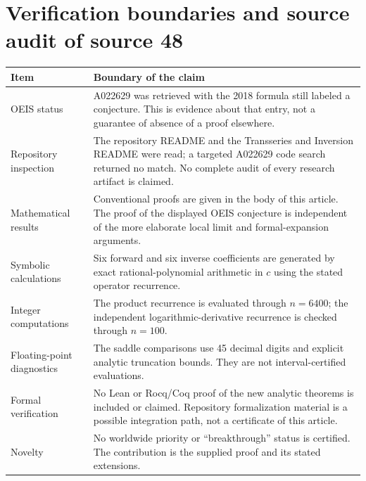 \documentclass[11pt]{article}
\numberwithin{equation}{section}
\theoremstyle{definition}\newtheorem{definition}[theorem]{Definition}
\theoremstyle{remark}\newtheorem{remark}[theorem]{Remark}
\begin{document}
\section{Verification boundaries and source audit of source 48}\label{dpn:48:app:audit}
\begin{center}
\small
\begin{tabular}{>{\raggedright\arraybackslash}p{}>{\raggedright\arraybackslash}p{}}
\toprule
Item & Boundary of the claim\\
\midrule
OEIS status & A022629 was retrieved with the 2018 formula still labeled a
conjecture.  This is evidence about that entry, not a guarantee of absence of
a proof elsewhere.\\[3pt]
Repository inspection & The repository README and the Transseries and
Inversion README were read; a targeted A022629 code search returned no match.
No complete audit of every research artifact is claimed.\\[3pt]
Mathematical results & Conventional proofs are given in the body of this
article.  The proof of the displayed OEIS conjecture is independent of the
more elaborate local limit and formal-expansion arguments.\\[3pt]
Symbolic calculations & Six forward and six inverse coefficients are generated
by exact rational-polynomial arithmetic in $c$ using the stated operator
recurrence.\\[3pt]
Integer computations & The product recurrence is evaluated through $n=6400$;
the independent logarithmic-derivative recurrence is checked through
$n=100$.\\[3pt]
Floating-point diagnostics & The saddle comparisons use 45 decimal digits and
explicit analytic truncation bounds.  They are not interval-certified
evaluations.\\[3pt]
Formal verification & No Lean or Rocq/Coq proof of the new analytic theorems
is included or claimed.  Repository formalization material is a possible
integration path, not a certificate of this article.\\[3pt]
Novelty & No worldwide priority or ``breakthrough'' status is certified.  The
contribution is the supplied proof and its stated extensions.\\
\bottomrule
\end{tabular}
\end{center}
\end{document}
